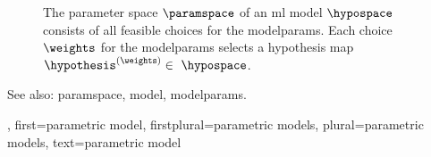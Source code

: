 {{\begin{figure}[H]
\begin{center}
			\end{center} 
			\caption{The \gls{parameter} space $\paramspace$ of an \gls{ml} \gls{model} $\hypospace$ consists of all 
			feasible choices for the \glspl{modelparam}. Each choice $\weights$ for the \glspl{modelparam} 
			selects a \gls{hypothesis} \gls{map} $\hypothesis^{(\weights)} \in \hypospace$.
				 \label{fig_param_model_dict}} 
			\end{figure}
			See also: \gls{paramspace}, \gls{model}, \glspl{modelparam}.},
		first={parametric model},
		firstplural={parametric models},
		plural={parametric models},
		text={parametric model}
}


